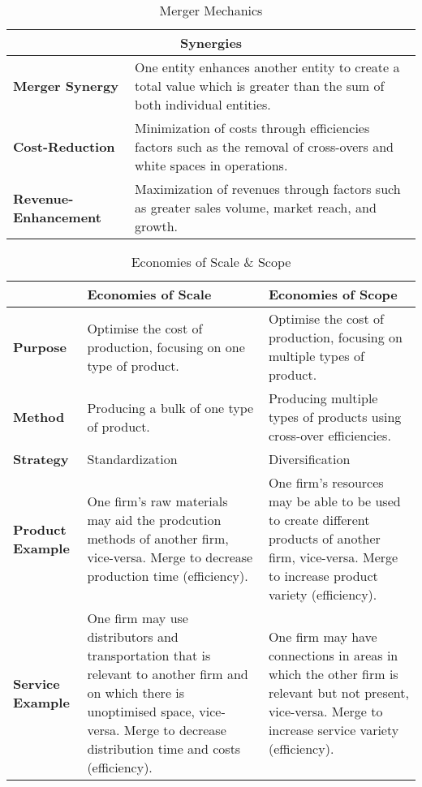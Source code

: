 \documentclass[11pt, english]{article}
\begin{document}
\begin{table}[h]
\begin{center}
\begin{tabular}{p{4.5cm}p{8cm}}
	\hline
	\multicolumn{2}{c}{\textbf{Synergies}}\\
	\hline
	\textbf{Merger Synergy} & One entity enhances another entity to create a total value which is greater than the sum of both individual entities.\\
	\textbf{Cost-Reduction} & Minimization of costs through efficiencies factors such as the removal of cross-overs and white spaces in operations.\\
	\textbf{Revenue-Enhancement} & Maximization of revenues through factors such as greater sales volume, market reach, and growth.\\
	\hline
\end{tabular}
        \caption{Merger Mechanics}
\end{center}
\end{table}

\newpage

\begin{table}[h]
        \scriptsize
	\renewcommand{\arraystretch}{1.25}
\begin{center}
\begin{tabular}{p{3cm}p{4.5cm}p{4.5cm}}
        & \textbf{Economies of Scale} & \textbf{Economies of Scope}\\
        \hline
	\textbf{Purpose} & Optimise the cost of production, focusing on one type of product. & Optimise the cost of production, focusing on multiple types of product.\\
	\textbf{Method} & Producing a bulk of one type of product. & Producing multiple types of products using cross-over efficiencies.\\
	\textbf{Strategy} & Standardization & Diversification\\
	\textbf{Product Example} & One firm's raw materials may aid the prodcution methods of another firm, vice-versa. Merge to decrease production time (efficiency). & One firm's resources may be able to be used to create different products of another firm, vice-versa. Merge to increase product variety (efficiency).\\
	\textbf{Service Example} & One firm may use distributors and transportation that is relevant to another firm and on which there is unoptimised space, vice-versa. Merge to decrease distribution time and costs (efficiency). & One firm may have connections in areas in which the other firm is relevant but not present, vice-versa. Merge to increase service variety (efficiency).\\
        \hline
\end{tabular}
        \caption{Economies of Scale \& Scope}
\end{center}
\end{table}
\end{document}
